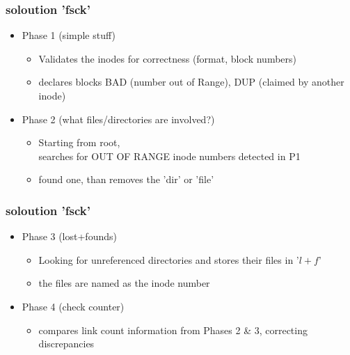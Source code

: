 \documentclass[hyperref={pdfpagelabels=false}]{beamer}
\begin{document}
        \begin{frame}
			\frametitle{soloution 'fsck'}
            \begin{itemize}
                \item<1-> Phase 1 (simple stuff)
                \begin{itemize}
                    \item<1-> Validates the inodes for correctness (format, block numbers)
                    \item<1-> declares blocks BAD (number out of Range), DUP (claimed by another inode)
                \end{itemize}
                \item<2-> Phase 2 (what files/directories are involved?)
                \begin{itemize}
                    \item<2-> Starting from root, \\
                              searches for OUT OF RANGE inode numbers detected in P1
                    \item<2-> found one, than removes the 'dir' or 'file'
                \end{itemize}
            \end{itemize}
        \end{frame}
        \begin{frame}
			\frametitle{soloution 'fsck'}
            \begin{itemize}
                \item<3-> Phase 3 (lost+founds)
                \begin{itemize}
                    \item<3-> Looking for unreferenced directories and stores their files in '$l+f$'
                    \item<3-> the files are named as the inode number
                \end{itemize}
                \item<1-> Phase 4 (check counter)
                \begin{itemize}
                    \item<1-> compares link count information from Phases 2 \& 3, correcting discrepancies
                \end{itemize}
            \end{itemize}
		\end{frame}
\end{document}
